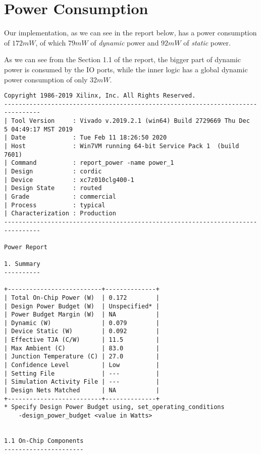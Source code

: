 \section{Power Consumption}\label{sec:power}

Our implementation, as we can see in the report below, has a power consumption
of \(172 mW\), of which \(79 mW\) of \emph{dynamic} power and \(92 mW\) of
\emph{static} power.

As we can see from the Section 1.1 of the report, the bigger part of dynamic
power is consumed by the IO ports, while the inner logic has a global dynamic
power consumption of only \(32 mW\).

\begin{Verbatim}[fontsize=\footnotesize,xleftmargin=-2cm]
Copyright 1986-2019 Xilinx, Inc. All Rights Reserved.
--------------------------------------------------------------------------------
| Tool Version     : Vivado v.2019.2.1 (win64) Build 2729669 Thu Dec  5 04:49:17 MST 2019
| Date             : Tue Feb 11 18:26:50 2020
| Host             : Win7VM running 64-bit Service Pack 1  (build 7601)
| Command          : report_power -name power_1
| Design           : cordic
| Device           : xc7z010clg400-1
| Design State     : routed
| Grade            : commercial
| Process          : typical
| Characterization : Production
--------------------------------------------------------------------------------

Power Report

1. Summary
----------

+--------------------------+--------------+
| Total On-Chip Power (W)  | 0.172        |
| Design Power Budget (W)  | Unspecified* |
| Power Budget Margin (W)  | NA           |
| Dynamic (W)              | 0.079        |
| Device Static (W)        | 0.092        |
| Effective TJA (C/W)      | 11.5         |
| Max Ambient (C)          | 83.0         |
| Junction Temperature (C) | 27.0         |
| Confidence Level         | Low          |
| Setting File             | ---          |
| Simulation Activity File | ---          |
| Design Nets Matched      | NA           |
+--------------------------+--------------+
* Specify Design Power Budget using, set_operating_conditions
	-design_power_budget <value in Watts>


1.1 On-Chip Components
----------------------


\end{Verbatim}
